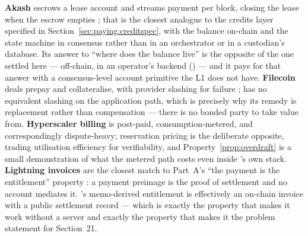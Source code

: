 \textbf{Akash} escrows a lease account and streams payment per block, closing the lease when the
escrow empties \citep{akash}; that is the closest analogue to the credits layer specified in
Section~\ref{sec:paying:creditspec}, with the balance on-chain and the state machine in consensus
rather than in an orchestrator or in a custodian's database. Its answer to ``where does the balance
live'' is the opposite of the one settled here --- off-chain, in an operator's backend
() --- and it pays for that answer with a consensus-level
account primitive the \Flux L1 does not have. \textbf{Filecoin} deals prepay and collateralise, with
provider slashing for failure \citep{filecoin2017}; \Flux has no equivalent slashing on the
application path, which is precisely why its remedy is replacement rather than compensation --- there
is no bonded party to take value from. \textbf{Hyperscaler billing} is post-paid,
consumption-metered, and correspondingly dispute-heavy; reservation pricing is the deliberate
opposite, trading utilisation efficiency for verifiability, and Property~\ref{prop:overdraft} is a
small demonstration of what the metered path costs even inside \Flux's own stack.
\textbf{Lightning invoices} are the closest match to Part~A's ``the payment is the entitlement''
property \citep{poon2016lightning}: a payment preimage is the proof of settlement and no account
mediates it. \CumulusVPN's memo-derived entitlement is effectively an on-chain invoice with a public
settlement record --- which is exactly the property that makes it work without a server and exactly
the property that makes it the problem statement for Section~21.

\FloatBarrier
